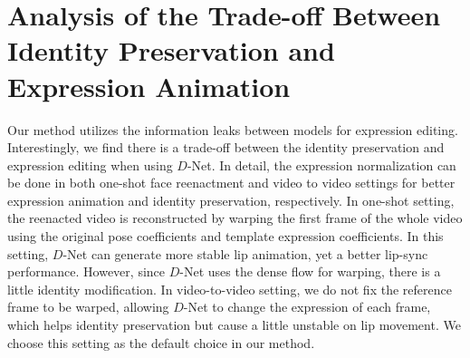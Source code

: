 \section{Analysis of the Trade-off Between Identity Preservation and Expression Animation}

Our method utilizes the information leaks between models for expression editing. Interestingly,
we find there is a trade-off between the identity preservation and expression editing when using $D$-Net. In detail, the expression normalization can be done in both one-shot face reenactment and video to video settings for better expression animation and identity preservation, respectively. 
In one-shot setting, the reenacted video is reconstructed by warping the first frame of the whole video using the original pose coefficients and template expression coefficients. In this setting, $D$-Net can generate more stable lip animation, yet a better lip-sync performance. However, since $D$-Net uses the dense flow for warping, there is a little identity modification.
In video-to-video setting, we do not fix the reference frame to be warped, allowing $D$-Net to change the expression of each frame, which helps identity preservation but cause a little unstable on lip movement. We choose this setting as the default choice in our method.


